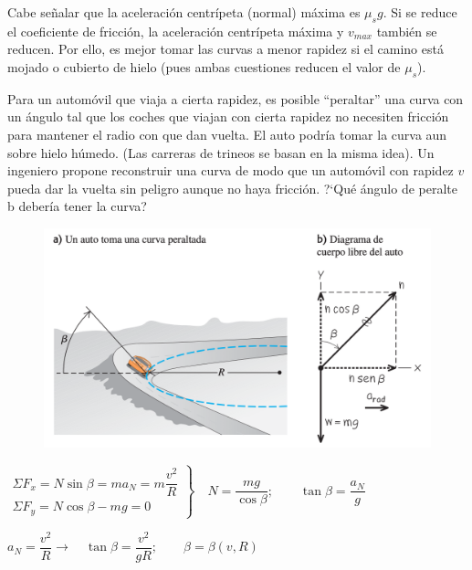  \small{\textsf{Cabe señalar que la aceleración centrípeta (normal) máxima es $\mu_s g$. Si se reduce el coeficiente de fricción, la aceleración centrípeta máxima y $v_{max}$ también se reducen. Por ello, es mejor tomar las curvas a menor rapidez si el camino está mojado o cubierto de hielo (pues ambas cuestiones reducen el valor de $\mu_s$)}}\normalsize{.}
 
 \begin{prob}
 Para un automóvil que viaja a cierta rapidez, es posible ``peraltar'' una curva con un ángulo tal que los coches que viajan con cierta rapidez no necesiten fricción para mantener el radio con que dan vuelta. El auto podría tomar la curva aun sobre hielo húmedo. (Las carreras de trineos se basan en la misma idea). Un ingeniero propone reconstruir una curva de modo que un automóvil con rapidez $v$ pueda dar la vuelta sin peligro aunque no haya fricción. ?`Qué ángulo de peralte b debería tener la curva?	
 \end{prob}
 \vspace{-5mm}%
\begin{figure}[H]
	\centering
	\includegraphics[width=.9\textwidth]{imagenes/imagenes03/T03IM45.png}
	\end{figure}
 
 
 $\left. \begin{array}{ll}
\Sigma F_x= N\sin \beta=m a_N = m \dfrac {v^2}{R} \\ \Sigma F_y=N\cos \beta-mg=0
 \end{array}\right\} \quad N=\dfrac{mg}{\cos \beta};\qquad \tan \beta=\dfrac{a_N}{g}$
 
 $a_N=\dfrac {v^2}{R} \to \quad \tan \beta = \dfrac {v^2}{gR};\qquad \beta=\beta(v,R)$
 

